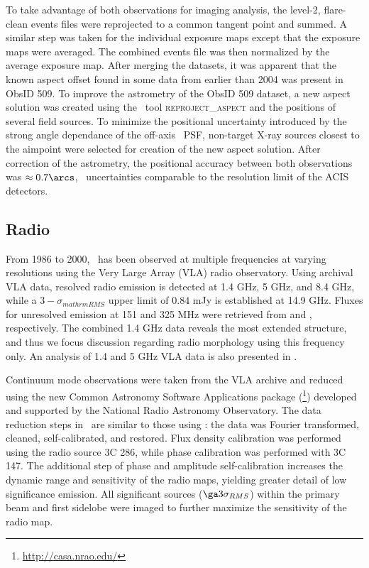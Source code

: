 \documentclass{emulateapj}
\begin{document}
To take advantage of both observations for imaging analysis, the
level-2, flare-clean events files were reprojected to a common tangent
point and summed. A similar step was taken for the individual exposure
maps except that the exposure maps were averaged. The combined events
file was then normalized by the average exposure map. After merging
the datasets, it was apparent that the known aspect offset found in
some data from earlier than 2004 was present in ObsID 509. To improve
the astrometry of the ObsID 509 dataset, a new aspect solution was
created using the \ciao\ tool {\textsc{reproject\_aspect}} and the
positions of several field sources. To minimize the positional
uncertainty introduced by the strong angle dependance of the off-axis
\chandra\ PSF, non-target X-ray sources closest to the aimpoint were
selected for creation of the new aspect solution. After correction of
the astrometry, the positional accuracy between both observations was
$\approx 0.7\arcs$, \ie\ uncertainties comparable to the resolution
limit of the ACIS detectors.

\subsection{Radio}
\label{sec:radio}

From 1986 to 2000, \iras\ has been observed at multiple frequencies at
varying resolutions using the Very Large Array (VLA) radio
observatory. Using archival VLA data, resolved radio emission is
detected at 1.4 GHz, 5 GHz, and 8.4 GHz, while a
$3-\sigma_{mathrm{RMS}}$ upper limit of $0.84$ mJy is established at
14.9 GHz. Fluxes for unresolved emission at 151 and 325 MHz were
retrieved from \citet{1999MNRAS.306...31R} and
\citet{1997A&AS..124..259R}, respectively. The combined 1.4 GHz data
reveals the most extended structure, and thus we focus discussion
regarding radio morphology using this frequency only. An analysis of
1.4 and 5 GHz VLA data is also presented in
\citet{1993ApJ...415...82H}.

Continuum mode observations were taken from the VLA archive and
reduced using the new Common Astronomy Software Applications package
(\casa\footnote{\url{http://casa.nrao.edu/}}) developed and supported
by the National Radio Astronomy Observatory. The data reduction steps
in \casa\ are similar to those using \aips: the data was Fourier
transformed, cleaned, self-calibrated, and restored. Flux density
calibration was performed using the radio source 3C 286, while phase
calibration was performed with 3C 147. The additional step of phase
and amplitude self-calibration increases the dynamic range and
sensitivity of the radio maps, yielding greater detail of low
significance emission. All significant sources ($\ga 3\sigma_{RMS}$)
within the primary beam and first sidelobe were imaged to further
maximize the sensitivity of the radio map.
\end{document}
